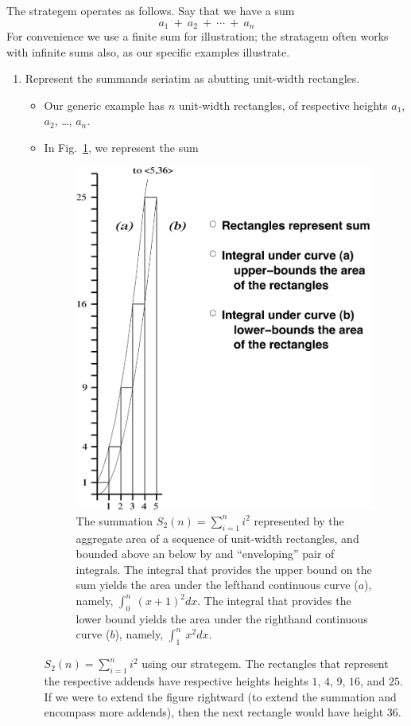 The strategem operates as follows.  Say that we have a sum
\[ a_1 \ + \ a_2 \ + \ \cdots \ + \ a_n \]
For convenience we use a finite sum for illustration; the stratagem
often works with infinite sums also, as our specific examples
illustrate.
\begin{enumerate}
\item
Represent the summands seriatim as abutting unit-width rectangles.  
  \begin{itemize}
  \item
Our generic example has $n$ unit-width rectangles, of respective
heights $a_1$, $a_2$, \ldots, $a_n$.

  \item
In Fig.~\ref{fig:riemann-n2}, we represent the sum
\begin{figure}[htb]
\centerline{
\includegraphics[scale=0.42]{riemann.pdf}
}
\caption{The summation $S_2(n) = \sum_{i=1}^n  i^2$ represented by
  the aggregate area of a sequence of unit-width rectangles, and
  bounded above an below by and ``enveloping'' pair of integrals.  The
  integral that provides the upper bound on the sum yields the area
  under the lefthand continuous curve ($a$), namely, $\int_0^n
  \ (x+1)^2 dx$.  The integral that provides the lower bound yields
  the area under the righthand continuous curve ($b$), namely,
  $\int_1^n \ x^2 dx$.}
\label{fig:riemann-n2}
\end{figure}
$S_2(n) = \sum_{i=1}^n  i^2$ using our strategem.  The rectangles
that represent the respective addends have respective heights heights
$1$, $4$, $9$, $16$, and $25$.  If we were to extend the figure
rightward (to extend the summation and encompass more addends), then
the next rectangle would have height $36$.


\end{itemize}
\end{enumerate}
